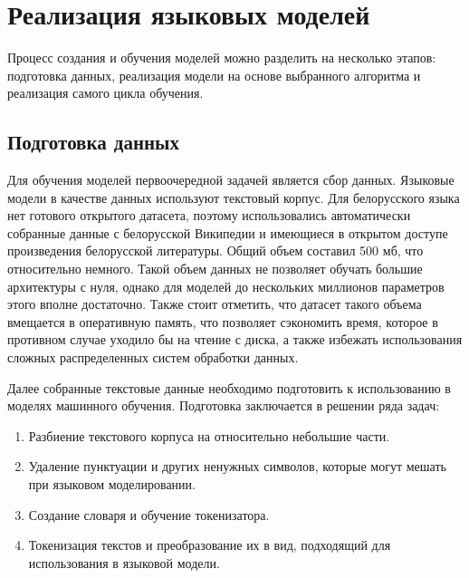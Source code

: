 
\section{Реализация языковых моделей}
\label{sec:arch}

Процесс создания и обучения моделей можно разделить на несколько этапов: подготовка данных, реализация модели на основе выбранного алгоритма и реализация самого цикла обучения. 

\subsection{Подготовка данных}
\label{sec:arch:data}

Для обучения моделей первоочередной задачей является сбор данных. Языковые модели в качестве данных используют текстовый корпус. Для белорусского языка нет готового открытого датасета, поэтому использовались автоматически собранные данные с белорусской Википедии и имеющиеся в открытом доступе произведения белорусской литературы. Общий объем составил 500 мб, что относительно немного. Такой объем данных не позволяет обучать большие архитектуры с нуля, однако для моделей до нескольких миллионов параметров этого вполне достаточно. Также стоит отметить, что датасет такого объема вмещается в оперативную память, что позволяет сэкономить время, которое в противном случае уходило бы на чтение с диска, а также избежать использования сложных распределенных систем обработки данных.

Далее собранные текстовые данные необходимо подготовить к использованию в моделях машинного обучения. Подготовка заключается в решении ряда задач:

\begin{enumerate}
	\item Разбиение текстового корпуса на относительно небольшие части.
	\item Удаление пунктуации и других ненужных символов, которые могут мешать при языковом моделировании.
	\item Создание словаря и обучение токенизатора.
	\item Токенизация текстов и преобразование их в вид, подходящий для использования в языковой модели.
\end{enumerate}

